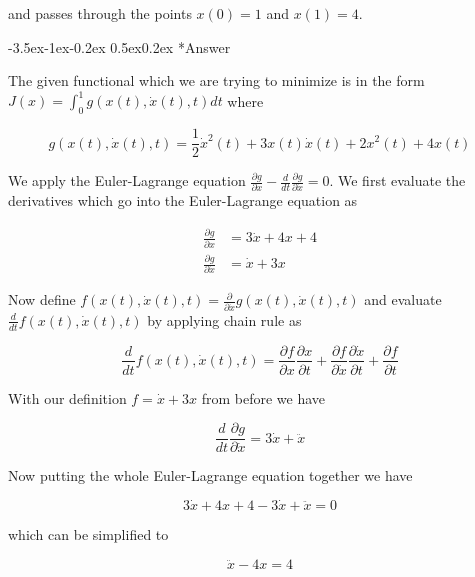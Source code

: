 \documentclass[11pt,letterpaper,onecolumn,notitlepage]{article}
\makeatletter
\renewcommand\subsection{\@startsection{subsection}{1}{\z@}%
{-3.5ex\@plus-1ex\@minus-0.2ex}%
{0.5ex\@plus0.2ex}%
{\fontsize{10pt}{10pt}\selectfont\bfseries\sffamily}}
\makeatother
\begin{document}
and passes through the points $x(0)=1$ and $x(1)=4$.

\subsection*{Answer}

The given functional which we are trying to minimize is in the form $J(x)=\int_{0}^{1}g(x(t),\dot{x}(t),t)dt$ where

\begin{equation*}
g(x(t),\dot{x}(t),t)=\frac{1}{2}\dot{x}^{2}(t)+3x(t)\dot{x}(t)+2x^{2}(t)+4x(t)
\end{equation*}

We apply the Euler-Lagrange equation $\frac{\partial{}g}{\partial{}x}-\frac{d}{dt}\frac{\partial{}g}{\partial\dot{x}}=0$.
We first evaluate the derivatives which go into the Euler-Lagrange equation as

\begin{align*}
\frac{\partial{}g}{\partial{}x}&=3\dot{x}+4x+4 \\
\frac{\partial{}g}{\partial\dot{x}}&=\dot{x}+3x
\end{align*}

Now define $f(x(t),\dot{x}(t),t)=\frac{\partial}{\partial\dot{x}}g(x(t),\dot{x}(t),t)$ and evaluate $\frac{d}{dt}f(x(t),\dot{x}(t),t)$ by applying chain rule as

\begin{equation*}
  \frac{d}{dt}f(x(t),\dot{x}(t),t)=
  \frac{\partial{}f}{\partial{}x}\frac{\partial{}x}{\partial{}t}+
  \frac{\partial{}f}{\partial\dot{x}}\frac{\partial\dot{x}}{\partial{}t}+
  \frac{\partial{}f}{\partial{}t}
\end{equation*}

With our definition $f=\dot{x}+3x$ from before we have

\begin{equation*}
  \frac{d}{dt}\frac{\partial{}g}{\partial\dot{x}}=3\dot{x}+\ddot{x}
\end{equation*}

Now putting the whole Euler-Lagrange equation together we have

\begin{equation*}
  3\dot{x}+4x+4-3\dot{x}+\ddot{x}=0
\end{equation*}

which can be simplified to

\begin{equation*}
  \ddot{x}-4x=4
\end{equation*}
\end{document}
